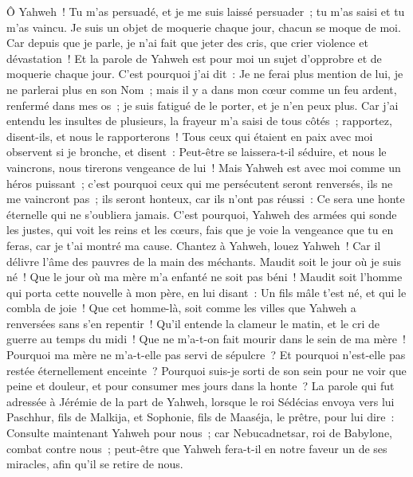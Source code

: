 \begin{multicols}{2}
Ô Yahweh~! Tu m'as persuadé, et je me suis laissé persuader~; tu m'as saisi et tu m'as vaincu. Je suis un objet de moquerie chaque jour, chacun se moque de moi.
Car depuis que je parle, je n'ai fait que jeter des cris, que crier violence et dévastation~! Et la parole de Yahweh est pour moi un sujet d'opprobre et de moquerie chaque jour.
C'est pourquoi j'ai dit~: Je ne ferai plus mention de lui, je ne parlerai plus en son Nom~; mais il y a dans mon cœur comme un feu ardent, renfermé dans mes os~; je suis fatigué de le porter, et je n'en peux plus.
Car j'ai entendu les insultes de plusieurs, la frayeur m'a saisi de tous côtés~; rapportez, disent-ils, et nous le rapporterons~! Tous ceux qui étaient en paix avec moi observent si je bronche, et disent~: Peut-être se laissera-t-il séduire, et nous le vaincrons, nous tirerons vengeance de lui~!
Mais Yahweh est avec moi comme un héros puissant~; c'est pourquoi ceux qui me persécutent seront renversés, ils ne me vaincront pas~; ils seront honteux, car ils n'ont pas réussi~: Ce sera une honte éternelle qui ne s'oubliera jamais.
C'est pourquoi, Yahweh des armées qui sonde les justes, qui voit les reins et les cœurs, fais que je voie la vengeance que tu en feras, car je t'ai montré ma cause.
Chantez à Yahweh, louez Yahweh~! Car il délivre l'âme des pauvres de la main des méchants.
Maudit soit le jour où je suis né~! Que le jour où ma mère m'a enfanté ne soit pas béni~!
Maudit soit l'homme qui porta cette nouvelle à mon père, en lui disant~: Un fils mâle t'est né, et qui le combla de joie~!
Que cet homme-là, soit comme les villes que Yahweh a renversées sans s'en repentir~! Qu'il entende la clameur le matin, et le cri de guerre au temps du midi~!
Que ne m'a-t-on fait mourir dans le sein de ma mère~! Pourquoi ma mère ne m'a-t-elle pas servi de sépulcre~? Et pourquoi n'est-elle pas restée éternellement enceinte~?
Pourquoi suis-je sorti de son sein pour ne voir que peine et douleur, et pour consumer mes jours dans la honte~?
\VerseOne{}La parole qui fut adressée à Jérémie de la part de Yahweh, lorsque le roi Sédécias envoya vers lui Paschhur, fils de Malkija, et Sophonie, fils de Maaséja, le prêtre, pour lui dire~:
Consulte maintenant Yahweh pour nous~; car Nebucadnetsar, roi de Babylone, combat contre nous~; peut-être que Yahweh fera-t-il en notre faveur un de ses miracles, afin qu'il se retire de nous.

\end{multicols}
